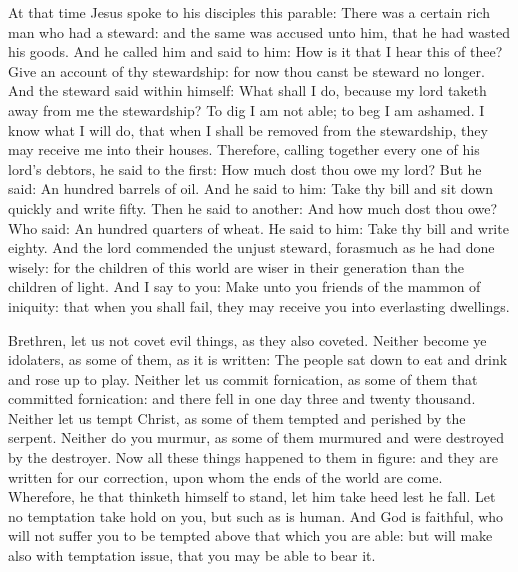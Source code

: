 
At that time Jesus spoke to his disciples this parable:
There was a certain rich man
who had a steward: and the same was accused unto him, that he had wasted
his goods.
And he called him and said to him: How is it that I hear this of
thee? Give an account of thy stewardship: for now thou canst be steward
no longer.
And the steward said within himself: What shall I do, because my
lord taketh away from me the stewardship? To dig I am not able; to beg I
am ashamed.
I know what I will do, that when I shall be removed from the
stewardship, they may receive me into their houses.
Therefore, calling together every one of his lord's debtors, he
said to the first: How much dost thou owe my lord?
But he said: An hundred barrels of oil. And he said to him: Take
thy bill and sit down quickly and write fifty.
Then he said to another: And how much dost thou owe? Who said: An
hundred quarters of wheat. He said to him: Take thy bill and write
eighty.
And the lord commended the unjust steward, forasmuch as he had
done wisely: for the children of this world are wiser in their
generation than the children of light.
And I say to you: Make unto you friends of the mammon of iniquity:
that when you shall fail, they may receive you into everlasting
dwellings.



\bigskip



Brethren, %
let us not covet evil things, as they also coveted.
Neither become ye idolaters, as some of them, as it is written:
The people sat down to eat and drink and rose up to play.
Neither let us commit fornication, as some of them that committed
fornication: and there fell in one day three and twenty thousand.
Neither let us tempt Christ, as some of them tempted and perished
by the serpent.
Neither do you murmur, as some of them murmured and were
destroyed by the destroyer.
Now all these things happened to them in figure: and they are
written for our correction, upon whom the ends of the world are come.
Wherefore, he that thinketh himself to stand, let him take heed
lest he fall.
Let no temptation take hold on you, but such as is human.  And
God is faithful, who will not suffer you to be tempted above that which
you are able: but will make also with temptation issue, that you may be
able to bear it.



